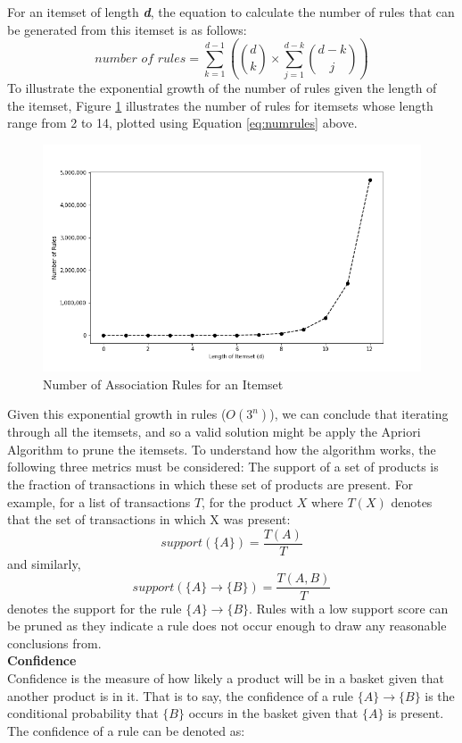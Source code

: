 \documentclass[paper=a4,fontsize=11pt]{report}	%
\newcommand{\setA}{\{A\}}
\newcommand{\setB}{\{B\}}
\newcommand{\abrule}{\setA\rightarrow\setB}
\begin{document}
For an itemset of length \textit{\textbf{d}}, the equation \cite{num_rules} to calculate the number of rules that can be generated from this itemset is as follows:
\begin{equation}
\textit{number of rules} = \sum\limits_{k=1}^{d-1} \left(\binom{d}{k} \times \sum\limits_{j=1}^{d-k}\binom{d-k}{j}  \right)
\label{eq:numrules}
\end{equation}
To illustrate the exponential growth of the number of rules given the length of the itemset, Figure \ref{fig:numrules} illustrates the number of rules for itemsets whose length range from 2 to 14, plotted using Equation \ref{eq:numrules} above.
\begin{figure}[H]
\centering
\includegraphics[scale=0.6]{numrules}
\caption{Number of Association Rules for an Itemset}
\label{fig:numrules}
\end{figure}
Given this exponential growth in rules ($O(3^n)$), we can conclude that iterating through all the itemsets, and so a valid solution might be apply the Apriori Algorithm to prune the itemsets. To understand how the algorithm works, the following three metrics must be considered:
The support of a set of products is the fraction of transactions in which these set of products are present. For example,  for a list of transactions $T$, for the product $X$ where $T(X)$ denotes that the set of transactions in which X was present:
\[
\textit{support}(\{A\}) = \frac{T(A)}{T}
\]
and similarly, 
\[
\textit{support}(\abrule) = \frac{T(A,B)}{T}
\]
denotes the support for the rule $\abrule$. Rules with a low support score can be pruned as they indicate a rule does not occur enough to draw any reasonable conclusions from.
\\\textbf{Confidence}\\
Confidence is the measure of how likely a product will be in a basket given that another product is in it. That is to say,  the confidence of a rule $\abrule$ is the conditional probability that $\setB$ occurs in the basket given that $\setA$ is present. The confidence of a rule can be denoted as:
\end{document}
